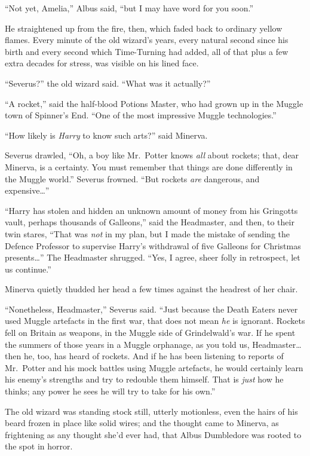 ``Not yet, Amelia,'' Albus said, ``but I may have word for you soon.''

He straightened up from the fire, then, which faded back to ordinary
yellow flames. Every minute of the old wizard's years, every natural
second since his birth and every second which Time-Turning had added,
all of that plus a few extra decades for stress, was visible on his
lined face.

``Severus?'' the old wizard said. ``What was it actually?''

``A rocket,'' said the half-blood Potions Master, who had grown up in
the Muggle town of Spinner's End. ``One of the most impressive Muggle
technologies.''

``How likely is \emph{Harry} to know such arts?'' said Minerva.

Severus drawled, ``Oh, a boy like Mr.~Potter knows \emph{all} about
rockets; that, dear Minerva, is a certainty. You must remember that
things are done differently in the Muggle world.'' Severus frowned.
``But rockets \emph{are} dangerous, and expensive\ldots{}''

``Harry has stolen and hidden an unknown amount of money from his
Gringotts vault, perhaps thousands of Galleons,'' said the Headmaster,
and then, to their twin stares, ``That was \emph{not} in my plan, but I
made the mistake of sending the Defence Professor to supervise Harry's
withdrawal of five Galleons for Christmas presents\ldots{}'' The
Headmaster shrugged. ``Yes, I agree, sheer folly in retrospect, let us
continue.''

Minerva quietly thudded her head a few times against the headrest of her
chair.

``Nonetheless, Headmaster,'' Severus said. ``Just because the Death
Eaters never used Muggle artefacts in the first war, that does not mean
\emph{he} is ignorant. Rockets fell on Britain as weapons, in the Muggle
side of Grindelwald's war. If he spent the summers of those years in a
Muggle orphanage, as you told us, Headmaster\ldots{} then he, too, has
heard of rockets. And if he has been listening to reports of Mr.~Potter
and his mock battles using Muggle artefacts, he would certainly learn
his enemy's strengths and try to redouble them himself. That is
\emph{just} how he thinks; any power he sees he will try to take for his
own.''

The old wizard was standing stock still, utterly motionless, even the
hairs of his beard frozen in place like solid wires; and the thought
came to Minerva, as frightening as any thought she'd ever had, that
Albus Dumbledore was rooted to the spot in horror.


